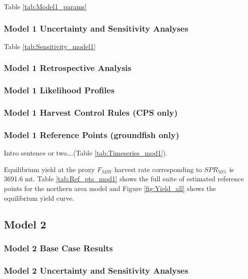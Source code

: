 \documentclass[12pt,]{article}
\begin{document}
Table \ref{tab:Model1_params}

\subsubsection{Model 1 Uncertainty and Sensitivity
Analyses}\label{model-1-uncertainty-and-sensitivity-analyses}

Table \ref{tab:Sensitivity_model1}

\subsubsection{Model 1 Retrospective
Analysis}\label{model-1-retrospective-analysis}

\subsubsection{Model 1 Likelihood
Profiles}\label{model-1-likelihood-profiles}

\subsubsection{Model 1 Harvest Control Rules (CPS
only)}\label{model-1-harvest-control-rules-cps-only}

\subsubsection{Model 1 Reference Points (groundfish
only)}\label{model-1-reference-points-groundfish-only}

Intro sentence or two\ldots{}.(Table \ref{tab:Timeseries_mod1}).

Equilibrium yield at the proxy \(F_{MSY}\) harvest rate corresponding to
\(SPR_{50\%}\) is 3691.6 mt. Table \ref{tab:Ref_pts_mod1} shows the full
suite of estimated reference points for the northern area model and
Figure \ref{fig:Yield_all} shows the equilibrium yield curve.

\subsection{Model 2}\label{model-2}

\subsubsection{Model 2 Base Case
Results}\label{model-2-base-case-results}

\subsubsection{Model 2 Uncertainty and Sensitivity
Analyses}\label{model-2-uncertainty-and-sensitivity-analyses}
\end{document}
